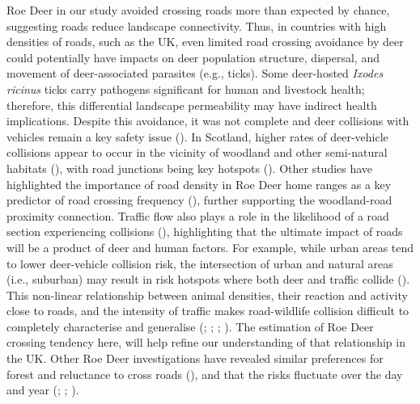 \documentclass[10pt,a4paper]{article}
\begin{document}
Roe Deer in our study avoided crossing roads more than expected by chance, suggesting roads reduce landscape connectivity.
Thus, in countries with high densities of roads, such as the UK, even limited road crossing avoidance by deer could potentially have impacts on deer population structure, dispersal, and movement of deer-associated parasites (e.g., ticks).
Some deer-hosted \emph{Ixodes ricinus} ticks carry pathogens significant for human and livestock health; therefore, this differential landscape permeability may have indirect health implications.
Despite this avoidance, it was not complete and deer collisions with vehicles remain a key safety issue ().
In Scotland, higher rates of deer-vehicle collisions appear to occur in the vicinity of woodland and other semi-natural habitats (), with road junctions being key hotspots ().
Other studies have highlighted the importance of road density in Roe Deer home ranges as a key predictor of road crossing frequency (), further supporting the woodland-road proximity connection.
Traffic flow also plays a role in the likelihood of a road section experiencing collisions (), highlighting that the ultimate impact of roads will be a product of deer and human factors.
For example, while urban areas tend to lower deer-vehicle collision risk, the intersection of urban and natural areas (i.e., suburban) may result in risk hotspots where both deer and traffic collide ().
This non-linear relationship between animal densities, their reaction and activity close to roads, and the intensity of traffic makes road-wildlife collision difficult to completely characterise and generalise (; ; ; ).
The estimation of Roe Deer crossing tendency here, will help refine our understanding of that relationship in the UK.
Other Roe Deer investigations have revealed similar preferences for forest and reluctance to cross roads (), and that the risks fluctuate over the day and year (; ; ).
\end{document}
